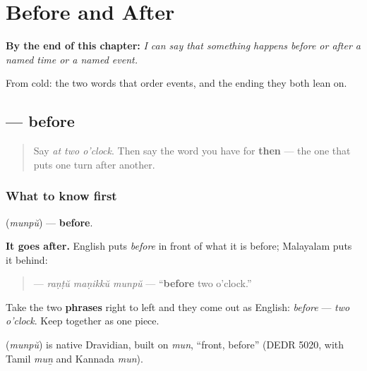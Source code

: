 
\chapter{Before and After}
\label{ch:ml-before-after}

\begin{chapteropening}
\textbf{By the end of this chapter:} \emph{I can say that something happens before or after a named time or a named event.}

From cold: the two words that order events, and the ending they both lean on.
\end{chapteropening}

\section[\texorpdfstring{\ml{മുൻപ്} (munpŭ)}{മുൻപ് (munpŭ)}]{ — before}

\label{lesson:ML-C106-munpu}



\begin{quote}
Say \emph{at two o'clock}. Then say the word you have for \textbf{then} — the one that puts one turn after another.
\end{quote}

\subsection*{What to know first}
\textbf{} (\emph{munpŭ}) — \textbf{before}.

\textbf{It goes after.} English puts \emph{before} in front of what it is before; Malayalam puts it behind:

\begin{quote}
\textbf{  } — \emph{raṇṭŭ maṇikkŭ munpŭ} — \textquotedblleft{}\textbf{before} two o'clock.\textquotedblright{}
\end{quote}

Take the two \textbf{phrases} right to left and they come out as English: \emph{before} — \emph{two o'clock}. Keep \textbf{ } together as one piece.

\begin{cousinweb}
\textbf{} (\emph{munpŭ}) is native Dravidian, built on \emph{mun}, \textquotedblleft{}front, before\textquotedblright{} (DEDR 5020, with Tamil \emph{muṉ} and Kannada \emph{mun}).
\end{cousinweb}


